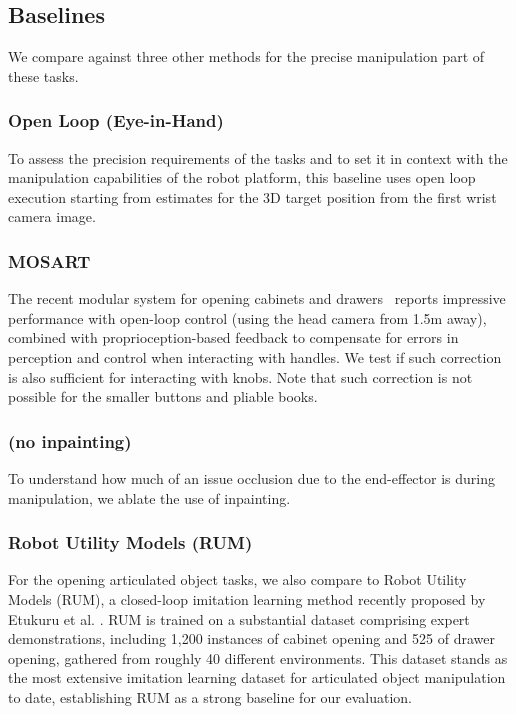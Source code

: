 \subsection{Baselines}
We compare against three other methods for the precise manipulation part of
these tasks. 
\subsubsection{Open Loop (Eye-in-Hand)} To assess the precision requirements of
the tasks and to set it in context with the manipulation capabilities of the
robot platform, this baseline uses open loop execution starting from estimates
for the 3D target position from the first wrist camera image.
\subsubsection{MOSART~\cite{gupta2024opening}}
The recent modular system for opening cabinets and drawers~\cite{gupta2024opening}
reports impressive performance with open-loop control (using the head camera from 1.5m away), combined with proprioception-based feedback to 
compensate for errors in perception and control when interacting with handles. 
We test if such correction is also sufficient for interacting with knobs. Note 
that such correction is not possible for the smaller buttons and pliable books.

\subsubsection{\name (no inpainting)} To understand how much of an issue
occlusion due to the end-effector is during manipulation, we ablate the use of
inpainting. %

\subsubsection{Robot Utility Models (RUM)~\cite{etukuru2024robot}}
For the opening articulated object tasks, we also compare to Robot Utility Models (RUM), 
a closed-loop imitation learning method recently proposed by Etukuru et al. \cite{etukuru2024robot}.
RUM is trained on a substantial dataset comprising expert demonstrations, including 
1,200 instances of cabinet opening and 525 of drawer opening, gathered from roughly 
40 different environments.
This dataset stands as the most extensive imitation 
learning dataset for articulated object manipulation to date, establishing RUM as a 
strong baseline for our evaluation.

